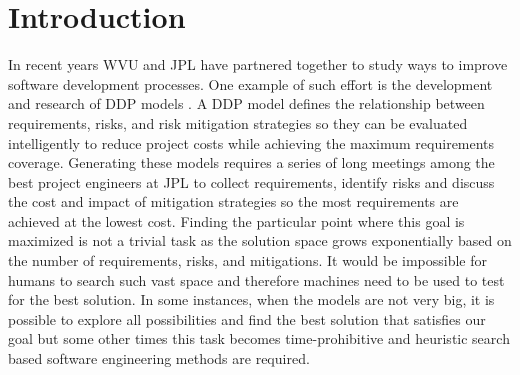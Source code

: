 \section{Introduction}
In recent years WVU and JPL have partnered together to study ways to improve software development processes. One example of such effort is the development and research of DDP models \cite{feather08}. A DDP model defines the relationship between requirements, risks, and risk mitigation strategies so they can be evaluated intelligently to reduce project costs while achieving the maximum requirements coverage. Generating these models requires a series of long meetings among the best project engineers at JPL to collect requirements, identify risks and discuss the cost and impact of mitigation strategies so the most requirements are achieved at the lowest cost. Finding the particular point where this goal is maximized is not a trivial task as the solution space grows exponentially based on the number of requirements, risks, and mitigations. It would be impossible for humans to search such vast space and therefore machines need to be used to test for the best solution. In some instances, when the models are not very big, it is possible to explore all possibilities and find the best solution that satisfies our goal but some other times this task becomes time-prohibitive and heuristic search based software engineering methods are required.